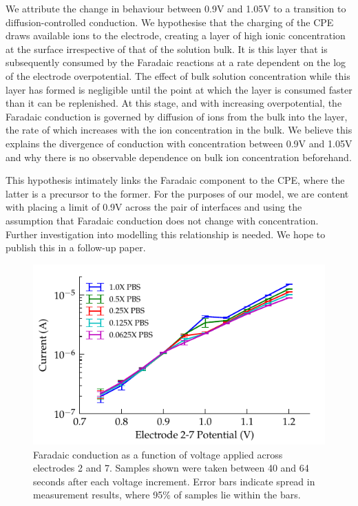 \documentclass[journal, a4paper]{IEEEtran}
\begin{document}
We attribute the change in behaviour between 0.9\thinspace V and 1.05\thinspace V to a transition to diffusion-controlled conduction.
We hypothesise that the charging of the CPE draws available ions to the electrode, creating a layer of high ionic concentration at the surface irrespective of that of the solution bulk. It is this layer that is subsequently consumed by the Faradaic reactions at a rate dependent on the log of the electrode overpotential.  The effect of bulk solution concentration while this layer has formed is negligible until the point at which the layer is consumed faster than it can be replenished. At this stage, and with increasing overpotential, the Faradaic conduction is governed by diffusion of ions from the bulk into the layer, the rate of which increases with the ion concentration in the bulk. We believe this explains the divergence of conduction with concentration between 0.9\thinspace V and 1.05\thinspace V and why there is no observable dependence on bulk ion concentration beforehand.

This hypothesis intimately links the Faradaic component to the CPE, where the latter is a precursor to the former. For the purposes of our model, we are content with placing a limit of 0.9\thinspace V across the pair of interfaces and using the assumption that Faradaic conduction does not change with concentration. Further investigation into modelling this relationship is needed. We hope to publish this in a follow-up paper.

\begin{figure}
    \begin{center}
        \includegraphics{graphics/currentVoltage_logY_IEEE}
    \end{center}
    \caption{Faradaic conduction as a function of voltage applied across electrodes 2 and 7. Samples shown were taken between 40 and 64 seconds after each voltage increment. Error bars indicate spread in measurement results, where 95\% of samples lie within the bars.}
    \label{fig:faradaic_logCurrentVsVoltage}
\end{figure}
\end{document}
